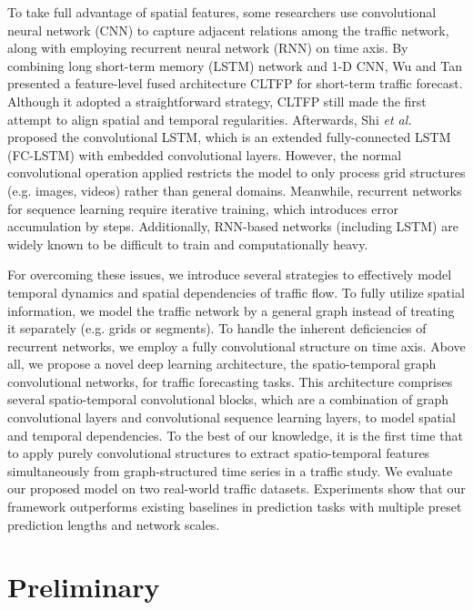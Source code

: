 \documentclass{article}
\begin{document}
To take full advantage of spatial features, some researchers use convolutional neural network (CNN) to capture adjacent relations among the traffic network, along with employing recurrent neural network (RNN) on time axis. By combining long short-term memory (LSTM) network \cite{hochreiter1997long} and 1-D CNN, Wu and Tan  presented a feature-level fused architecture CLTFP for short-term traffic forecast. Although it adopted a straightforward strategy, CLTFP still made the first attempt to align spatial and temporal regularities. Afterwards, Shi \emph{et al.}  proposed the convolutional LSTM, which is an extended fully-connected LSTM (FC-LSTM) with embedded convolutional layers. However, the normal convolutional operation applied restricts the model to only process grid structures (e.g. images, videos) rather than general domains. Meanwhile, recurrent networks for sequence learning require iterative training, which introduces error accumulation by steps. Additionally, RNN-based networks (including LSTM) are widely known to be difficult to train and computationally heavy. 

For overcoming these issues, we introduce several strategies to effectively model temporal dynamics and spatial dependencies of traffic flow. To fully utilize spatial information, we model the traffic network by a general graph instead of treating it separately (e.g. grids or segments). To handle the inherent deficiencies of recurrent networks, we employ a fully convolutional structure on time axis. Above all, we propose a novel deep learning architecture, the spatio-temporal graph convolutional networks, for traffic forecasting tasks. This architecture comprises several spatio-temporal convolutional blocks, which are a combination of graph convolutional layers \cite{defferrard2016convolutional} and convolutional sequence learning layers, to model spatial and temporal dependencies. To the best of our knowledge, it is the first time that to apply purely convolutional structures to extract spatio-temporal features simultaneously from graph-structured time series in a traffic study. We evaluate our proposed model on two real-world traffic datasets. Experiments show that our framework outperforms existing baselines in prediction tasks with multiple preset prediction lengths and network scales.

\section{Preliminary}
\end{document}
